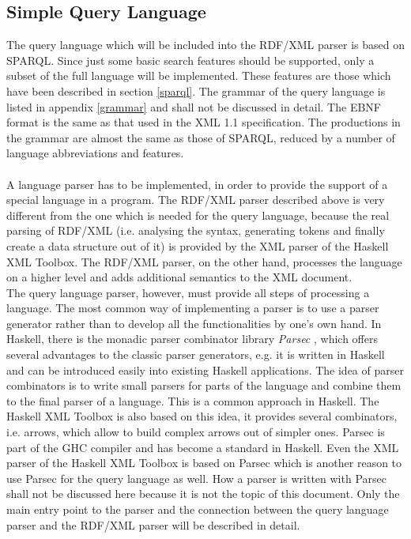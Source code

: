 \documentclass[11pt,a4paper,headsepline, bibtotoc]{scrreprt}
\begin{document}
\subsection{Simple Query Language}
The query language which will be included into the RDF/XML parser is based on SPARQL. Since just some basic search features should be supported, only a subset of the full language will be implemented. These features are those which have been described in section \ref{sparql}. The grammar of the query language is listed in appendix \ref{grammar} and shall not be discussed in detail.  The EBNF format is the same as that used in the XML 1.1 specification. The productions in the grammar are almost the same as those of SPARQL, reduced by a number of language abbreviations and features.\\
\\
A language parser has to be implemented, in order to provide the support of a special language in a program. The RDF/XML parser described above is very different from the one which is needed for the query language, because the real parsing of \mbox{RDF/XML} (i.e. analysing the syntax, generating tokens and finally create a data structure out of it) is provided by the XML parser of the Haskell XML Toolbox. The RDF/XML parser, on the other hand, processes the language on a higher level and adds additional semantics to the XML document.\\
The query language parser, however, must provide all steps of processing a language. The most common way of implementing a parser is to use a parser generator rather than to develop all the functionalities by one's own hand. In Haskell, there is the monadic parser combinator library \textit{Parsec} \cite{Parsec}, which offers several advantages to the classic parser generators, e.g. it is written in Haskell and can be introduced easily into existing Haskell applications. The idea of parser combinators is to write small parsers for parts of the language and combine them to the final parser of a language. This is a common approach in Haskell. The Haskell XML Toolbox is also based on this idea, it provides several combinators, i.e. arrows, which allow to build complex arrows out of simpler ones. Parsec is part of the GHC compiler and has become a standard in Haskell. Even the XML parser of the Haskell XML Toolbox is based on Parsec which is another reason to use Parsec for the query language as well. How a parser is written with Parsec shall not be discussed here because it is not the topic of this document. Only the main entry point to the parser and the connection between the query language parser and the RDF/XML parser will be described in detail.\\
\end{document}
